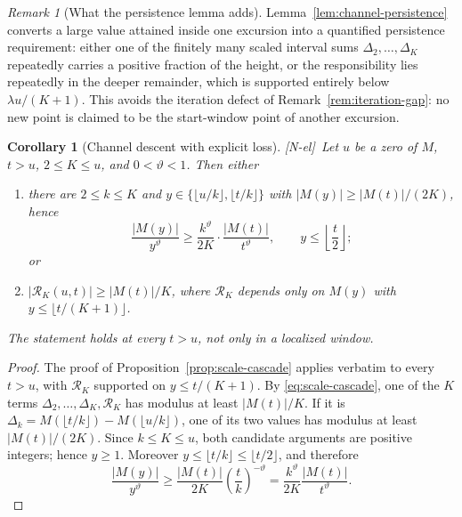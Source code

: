 \documentclass[11pt]{amsart}
\numberwithin{equation}{section}
\theoremstyle{plain}
\newtheorem{corollary}[theorem]{Corollary}
\theoremstyle{definition}
\theoremstyle{remark}
\newtheorem{remark}[theorem]{Remark}
\newcommand{\tagNE}{\textup{[N-el]}}
\begin{document}
\begin{remark}[What the persistence lemma adds]
\label{rem:persistence-content}
Lemma~\ref{lem:channel-persistence} converts a
large value attained inside one excursion into a quantified persistence
requirement: either one of the finitely many scaled interval sums
$\Delta_2,\ldots,\Delta_K$ repeatedly carries a positive fraction of the
height, or the responsibility lies repeatedly in the deeper remainder,
which is supported entirely below $\lambda u/(K+1)$.  This avoids the
iteration defect of Remark~\ref{rem:iteration-gap}: no new point is claimed
to be the start-window point of another excursion.
\end{remark}
\begin{corollary}[Channel descent with explicit loss]
\label{cor:channel-descent}
\tagNE\ Let $u$ be a zero of $M$, $t>u$, $2\le K\le u$, and $0<\vartheta<1$. Then either
\begin{enumerate}[label=\textup{(\roman*)}]
\item there are $2\le k\le K$ and $y\in\{\lfloor u/k\rfloor,\lfloor t/k\rfloor\}$
with $|M(y)|\ge|M(t)|/(2K)$, hence
\[
\frac{|M(y)|}{y^\vartheta}\ge\frac{k^\vartheta}{2K}\cdot\frac{|M(t)|}{t^\vartheta},
\qquad y\le\left\lfloor\frac t2\right\rfloor;
\]
or
\item $|\mathcal R_K(u,t)|\ge|M(t)|/K$, where $\mathcal R_K$ depends only on
$M(y)$ with $y\le\lfloor t/(K+1)\rfloor$.
\end{enumerate}
The statement holds at every $t>u$, not only in a localized window.
\end{corollary}

\begin{proof}
The proof of Proposition~\ref{prop:scale-cascade} applies verbatim to every
$t>u$, with $\mathcal R_K$ supported on $y\le t/(K+1)$. By \eqref{eq:scale-cascade}, one of the $K$ terms
$\Delta_2,\dots,\Delta_K,\mathcal R_K$ has modulus at least $|M(t)|/K$. If it is
$\Delta_k=M(\lfloor t/k\rfloor)-M(\lfloor u/k\rfloor)$, one of its two values
has modulus at least $|M(t)|/(2K)$. Since $k\le K\le u$, both candidate
arguments are positive integers; hence $y\ge1$. Moreover
$y\le\lfloor t/k\rfloor\le\lfloor t/2\rfloor$, and therefore
\[
 \frac{|M(y)|}{y^\vartheta}
 \ge \frac{|M(t)|}{2K}\left(\frac{t}{k}\right)^{-\vartheta}
 =\frac{k^\vartheta}{2K}\frac{|M(t)|}{t^\vartheta}.
\]
\end{proof}
\end{document}

